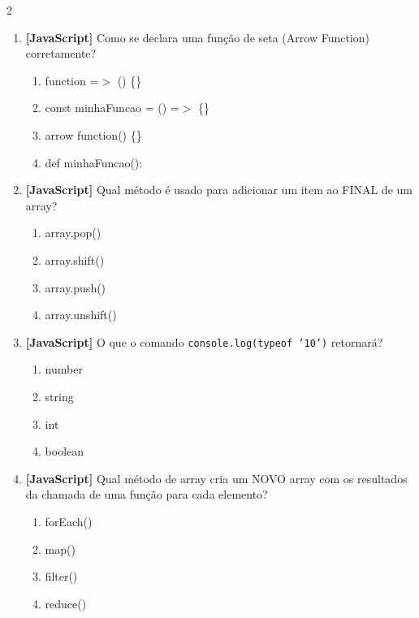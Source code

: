 \documentclass[a4paper,10pt]{article}
\begin{document}
\begin{multicols*}{2}
\begin{enumerate}[label=\textbf{\arabic*.}, resume, leftmargin=*]
\item \textbf{[JavaScript]} Como se declara uma função de seta (Arrow Function) corretamente?
\begin{enumerate}[label=(\alph*), noitemsep]
  \item function =$>$ () \{\}
  \item const minhaFuncao = () =$>$ \{\}
  \item arrow function() \{\}
  \item def minhaFuncao():
\end{enumerate}

\item \textbf{[JavaScript]} Qual método é usado para adicionar um item ao FINAL de um array?
\begin{enumerate}[label=(\alph*), noitemsep]
  \item array.pop()
  \item array.shift()
  \item array.push()
  \item array.unshift()
\end{enumerate}

\item \textbf{[JavaScript]} O que o comando \texttt{console.log(typeof '10')} retornará?
\begin{enumerate}[label=(\alph*), noitemsep]
  \item number
  \item string
  \item int
  \item boolean
\end{enumerate}

\item \textbf{[JavaScript]} Qual método de array cria um NOVO array com os resultados da chamada de uma função para cada elemento?
\begin{enumerate}[label=(\alph*), noitemsep]
  \item forEach()
  \item map()
  \item filter()
  \item reduce()
\end{enumerate}

\end{enumerate}
\end{multicols*}
\newpage
\end{document}
